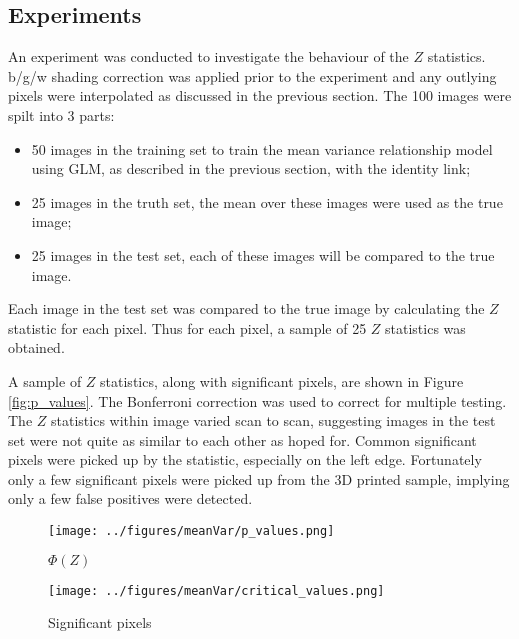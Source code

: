 \documentclass[a4paper]{proc}
\begin{document}
\subsection{Experiments}
An experiment was conducted to investigate the behaviour of the $Z$ statistics. b/g/w shading correction was applied prior to the experiment and any outlying pixels were interpolated as discussed in the previous section. The 100 images were spilt into 3 parts:
\begin{itemize}
	\item 50 images in the training set to train the mean variance relationship model using GLM, as described in the previous section, with the identity link;
	\item 25 images in the truth set, the mean over these images were used as the true image;
	\item 25 images in the test set, each of these images will be compared to the true image.
\end{itemize}
Each image in the test set was compared to the true image by calculating the $Z$ statistic for each pixel. Thus for each pixel, a sample of 25 $Z$ statistics was obtained.

A sample of $Z$ statistics, along with significant pixels, are shown in Figure \ref{fig:p_values}. The Bonferroni correction was used to correct for multiple testing. The $Z$ statistics within image varied scan to scan, suggesting images in the test set were not quite as similar to each other as hoped for. Common significant pixels were picked up by the statistic, especially on the left edge. Fortunately only a few significant pixels were picked up from the 3D printed sample, implying only a few false positives were detected.

\begin{figure*}
	\centering
	\begin{subfigure}{0.45\textwidth}
		\texttt{[image: ../figures/meanVar/p\_values.png]}
		\caption{$\Phi(Z)$}
	\end{subfigure}
	\begin{subfigure}{0.45\textwidth}
		\texttt{[image: ../figures/meanVar/critical\_values.png]}
		\caption{Significant pixels}
	\end{subfigure}
	\caption{A sample of $Z$ statistics obtained from comparing a scan from the test set to the true image. In a) the $Z$ statistics were transformed using the standard Normal c.d.f. In b) highlighted in red are significant pixels at the $5\sigma$ significance level corrected for multiple tests using the Bonferroni correction.}
	\label{fig:p_values}
\end{figure*}
\end{document}
